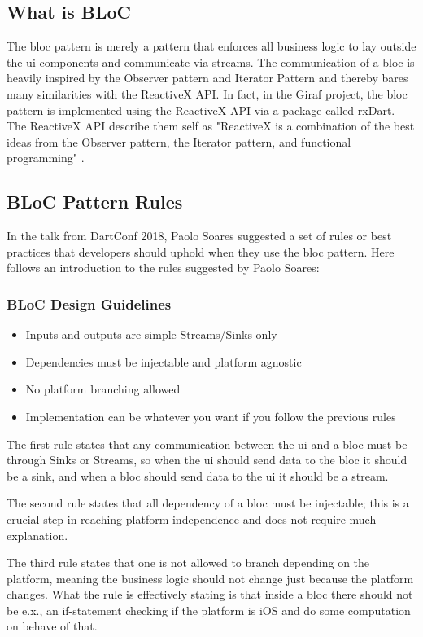 \subsection{What is BLoC}
The \gls{bloc} pattern is merely a pattern that enforces all business logic to lay outside the \gls{ui} components and communicate via streams. The communication of a \gls{bloc} is heavily inspired by the Observer pattern and Iterator Pattern and thereby bares many similarities with the ReactiveX API. In fact, in the Giraf project, the \gls{bloc} pattern is implemented using the ReactiveX API via a package called rxDart. The ReactiveX API describe them self as "ReactiveX is a combination of the best ideas from the Observer pattern, the Iterator pattern, and functional programming" \cite{ReactiveXWebsite}.

\subsection{BLoC Pattern Rules}
In the talk from DartConf 2018, Paolo Soares suggested a set of rules or best practices that developers should uphold when they use the \gls{bloc} pattern. Here follows an introduction to the rules suggested by Paolo Soares:

\subsubsection{BLoC Design Guidelines}
\begin{itemize}
  \item Inputs and outputs are simple Streams/Sinks only
  \item Dependencies must be injectable and platform agnostic
  \item No platform branching allowed
  \item Implementation can be whatever you want if you follow the previous rules
\end{itemize}

The first rule states that any communication between the \gls{ui} and a \gls{bloc} must be through Sinks or Streams, so when the \gls{ui} should send data to the \gls{bloc} it should be a sink, and when a \gls{bloc} should send data to the \gls{ui} it should be a stream.

The second rule states that all dependency of a \gls{bloc} must be injectable; this is a crucial step in reaching platform independence and does not require much explanation.

The third rule states that one is not allowed to branch depending on the platform, meaning the business logic should not change just because the platform changes. What the rule is effectively stating is that inside a \gls{bloc} there should not be e.x., an if-statement checking if the platform is iOS and do some computation on behave of that.

